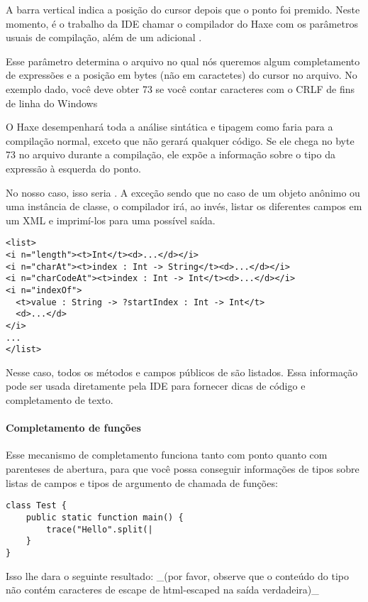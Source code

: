 A barra vertical indica a posição do cursor depois que o ponto foi premido. Neste momento, é o trabalho da IDE chamar o compilador do Haxe com os parâmetros usuais de compilação, além de um adicional .

Esse parâmetro determina o arquivo no qual nós queremos algum completamento de expressões e a posição em bytes (não em caractetes) do cursor no arquivo. No exemplo dado, você deve obter 73 se você contar caracteres com o CRLF de fins de linha do Windows 

O Haxe desempenhará toda a análise sintática e tipagem como faria para a compilação normal, exceto que não gerará qualquer código. Se ele chega no byte 73 no arquivo  durante a compilação, ele expõe a informação sobre o tipo da expressão à esquerda do ponto.

No nosso caso, isso seria . A exceção sendo que no caso de um objeto anônimo ou uma instância de classe, o compilador irá, ao invés, listar os diferentes campos em um XML e imprimí-los para uma possível saída. 


\begin{lstlisting}
<list>
<i n="length"><t>Int</t><d>...</d></i>
<i n="charAt"><t>index : Int -> String</t><d>...</d></i>
<i n="charCodeAt"><t>index : Int -> Int</t><d>...</d></i>
<i n="indexOf">
  <t>value : String -> ?startIndex : Int -> Int</t>
  <d>...</d>
</i>
...
</list>
\end{lstlisting}

Nesse caso, todos os métodos e campos públicos de  são listados. Essa informação pode ser usada diretamente pela IDE para fornecer dicas de código e completamento de texto.

\paragraph{Completamento de funções}
Esse mecanismo de completamento funciona tanto com ponto quanto com parenteses de abertura, para que você possa conseguir informações de tipos sobre listas de campos e tipos de argumento de chamada de funções:

\begin{lstlisting}
class Test {
    public static function main() {
        trace("Hello".split(|
    }
}
\end{lstlisting}

Isso lhe dara o seguinte resultado:  \_(por favor, observe que o conteúdo do tipo não contém caracteres de escape de html-escaped na saída verdadeira)\_

